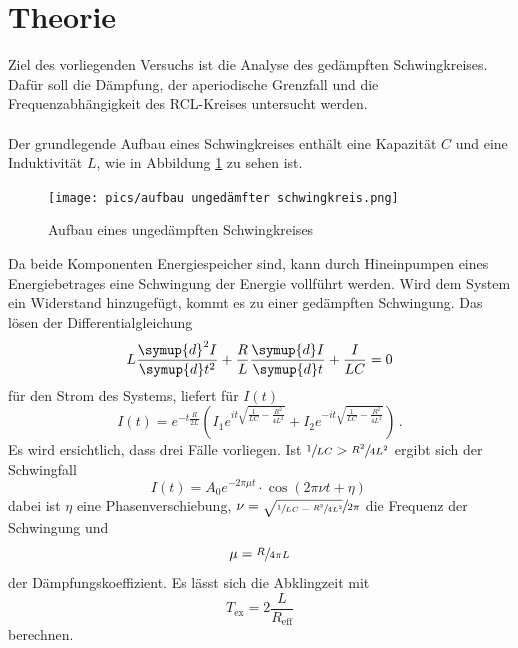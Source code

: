 \section{Theorie}
\label{sec:Theorie}
Ziel des vorliegenden Versuchs ist die Analyse des gedämpften Schwingkreises.
Dafür soll die Dämpfung, der aperiodische Grenzfall und die Frequenzabhängigkeit des RCL-Kreises untersucht werden.\\
\\
Der grundlegende Aufbau eines Schwingkreises enthält eine Kapazität $C$ und eine Induktivität $L$, wie in Abbildung \ref{fig:unged} zu sehen ist.
\begin{figure}
    \centering
    \caption{Aufbau eines ungedämpften Schwingkreises \cite{v354}} 
    \label{fig:unged}
    \texttt{[image: pics/aufbau ungedämfter schwingkreis.png]}
\end{figure}
Da beide Komponenten Energiespeicher sind, kann durch Hineinpumpen eines Energiebetrages eine Schwingung der Energie vollführt werden.
Wird dem System ein Widerstand hinzugefügt, kommt es zu einer gedämpften Schwingung. Das lösen der Differentialgleichung
\begin{equation}
    L \frac{\symup{d}^2 I}{\symup{d} t^2} + \frac{R}{L} \frac{\symup{d} I}{\symup{d} t} + \frac{I}{LC}=0
    \label{eqn:DGL}
\end{equation}
für den Strom des Systems, liefert für $I(t)$
\begin{equation}
    I(t)=e^{-t \frac{R}{2L}} \left(I_1 e^{i t \sqrt{\frac{1}{L C} - \frac{R^2}{4 L^2}}}+ I_2 e^{-i t \sqrt{\frac{1}{L C} - \frac{R^2}{4 L^2}}} \right) \, .
\end{equation}
Es wird ersichtlich, dass drei Fälle vorliegen. Ist $ \sfrac{1}{LC}> \sfrac{R^2}{4 L^2}$ ergibt sich der Schwingfall
\begin{equation}
    I(t)=A_0 e^{- 2 \pi \mu t} \cdot \cos(2 \pi \nu t + \eta) \, 
    \label{eqn:schwing}
\end{equation}
dabei ist $\eta$ eine Phasenverschiebung, $\nu=\sfrac{\sqrt{\sfrac{1}{L C}-\sfrac{R^2}{4 L^2}}}{2 \pi}$ die Frequenz der Schwingung und
\begin{equation}
    \mu=\sfrac{R}{4 \pi L}
    \label{eqn:muuh}
\end{equation}
der Dämpfungskoeffizient. Es lässt sich die Abklingzeit mit 
\begin{equation}
    T_\text{ex}=2 \frac{L}{R_\text{eff}}
    \label{eqn:abklingzeit}
\end{equation}
berechnen. \\
